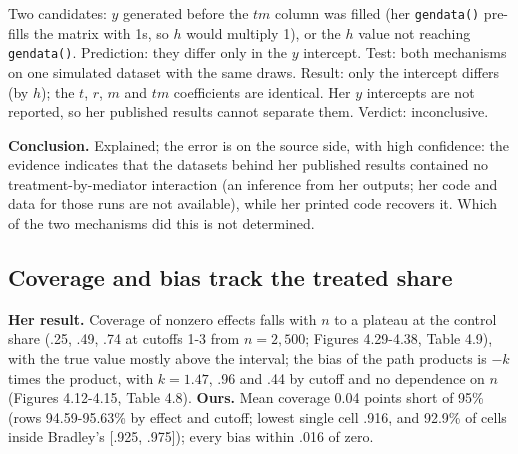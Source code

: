 \begin{description}[leftmargin=1em,style=nextline]
\item[Which mechanism removed the interaction (source).] Two candidates: $y$ generated before the $tm$ column was filled (her \texttt{gendata()} pre-fills the matrix with 1s, so $h$ would multiply 1), or the $h$ value not reaching \texttt{gendata()}. Prediction: they differ only in the $y$ intercept. Test: both mechanisms on one simulated dataset with the same draws. Result: only the intercept differs (by $h$); the $t$, $r$, $m$ and $tm$ coefficients are identical. Her $y$ intercepts are not reported, so her published results cannot separate them. Verdict: inconclusive.
\end{description}
\textbf{Conclusion.} Explained; the error is on the source side, with high confidence: the evidence indicates that the datasets behind her published results contained no treatment-by-mediator interaction (an inference from her outputs; her code and data for those runs are not available), while her printed code recovers it. Which of the two mechanisms did this is not determined.

\subsection{Coverage and bias track the treated share}\label{dis:population-values}

\textbf{Her result.} Coverage of nonzero effects falls with $n$ to a plateau at the control share (.25, .49, .74 at cutoffs 1-3 from $n = 2{,}500$; Figures 4.29-4.38, Table 4.9), with the true value mostly above the interval; the bias of the path products is $-k$ times the product, with $k = 1.47$, .96 and .44 by cutoff and no dependence on $n$ (Figures 4.12-4.15, Table 4.8). \textbf{Ours.} Mean coverage 0.04 points short of 95\% (rows 94.59-95.63\% by effect and cutoff; lowest single cell .916, and 92.9\% of cells inside Bradley's [.925, .975]); every bias within .016 of zero.


